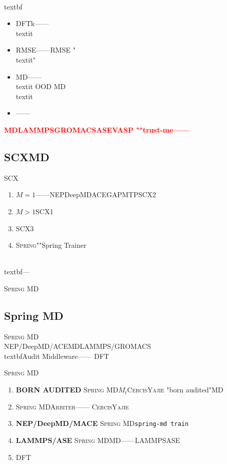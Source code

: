 \documentclass[12pt,a4paper]{article}
\theoremstyle{remark}
\newcommand{\SCX}{\textsc{SCX}}
\newcommand{\Spring}{\textsc{Spring}}
\newcommand{\Yajie}{\textsc{Yajie}}
\newcommand{\Cercis}{\textsc{Cercis}}
\newcommand{\Arbiter}{\textsc{Arbiter}}
\newcommand{\SpringMD}{\textsc{Spring MD}}
\newcommand{\honestcrit}[1]{%
    \textcolor{red}{\textbf{#1}}%
}
\begin{document}
\\textbf{}

\begin{itemize}[itemsep=3pt]
    \item DFTk——
    \\textit{}
    \item RMSE——RMSE
    "\\textit{}"
    \item MD——\\textit{}
    OOD
    MD\\textit{}
    \item ——
\end{itemize}

\honestcrit{MDLAMMPSGROMACSASEVASP
""trust-me——
}

\subsection{SCXMD}

\SCX{}\cite{scx_ml_audit,scx_hamiltonian,yajie_protocol,scx_spring_trainer}
\begin{enumerate}[label=(\arabic*),itemsep=3pt]
    \item $M=1$——NEPDeepMDACEGAPMTPSCX2
    \item $M>1$SCX1
    \item SCX3
    \item \Spring{}""Spring Trainer\cite{scx_spring_trainer}
\end{enumerate}

\\textbf{}---


\SpringMD{}

\subsection{Spring MD}

\SpringMD{}\\NEP/DeepMD/ACEMDLAMMPS/GROMACS
\\textbf{}Audit Middleware——
DFT

\SpringMD{}

\begin{enumerate}[label=\textbf{ \arabic*},leftmargin=*,itemsep=5pt]
    \item \textbf{BORN AUDITED}
    \SpringMD{}$M_t$\Cercis{}\Yajie{}
    "born audited"MD

    \item \textbf{}
    \SpringMD{}\Arbiter{}——
    \Cercis{}\Yajie{}

    \item \textbf{NEP/DeepMD/MACE}
    \SpringMD{}\texttt{spring-md train}

    \item \textbf{LAMMPS/ASE}
    \SpringMD{}MD——LAMMPSASE
    

    \item \textbf{}
    DFT
\end{enumerate}
\end{document}
